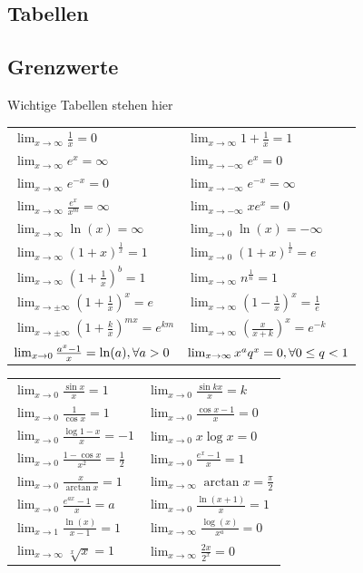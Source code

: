 \documentclass[8pt]{article}
\def\limxo{\lim_{x\to 0}}
\def\limxi{\lim_{x\to\infty}}
\def\limxn{\lim_{x\to-\infty}}
\begin{document}
\begin{multicols*}{3}
\newpage

\section{Tabellen}
\subsection{Grenzwerte}
Wichtige Tabellen stehen hier
\begin{center}
  \begin{tabularx}{\linewidth}{XX}

    $\limxi \frac{1}{x} = 0$ & $\limxi 1 + \frac{1}{x} = 1$ \\
    $\limxi e^x = \infty$ & $\limxn e^x = 0$ \\
    $\limxi e^{-x} = 0$ & $\limxn e^{-x} = \infty$ \\
    $\limxi \frac{e^x}{x^m} = \infty$ & $\limxn xe^x = 0$ \\
    $\limxi \ln(x) = \infty$ & $\limxo \ln(x) = -\infty$ \\
    $\limxi (1+x)^{\frac{1}{x}} = 1$ & $\limxo (1+x)^{\frac{1}{x}} = e$ \\
    $\limxi (1+\frac{1}{x})^b = 1$ & $\limxi n^{\frac{1}{n}} = 1$ \\
    $\lim_{x\to\pm\infty} (1 + \frac{1}{x})^x = e$ & $\limxi (1-\frac{1}{x})^x = \frac{1}{e}$ \\
    $\lim_{x\to\pm\infty} (1 + \frac{k}{x})^{mx} = e^{km}$ & $\limxi (\frac{x}{x+k})^x = e^{-k}$ \\
    $\limxo \frac{a^x -1}{x} = \ln(a), \newline \forall a > 0$ &
    $\limxi x^a q^x = 0, \newline \forall 0 \le q < 1$ \\
  \end{tabularx}
  \begin{tabularx}{\linewidth}{XX}
    $\limxo \frac{\sin x}{x} = 1$ & $\limxo \frac{\sin kx}{x} = k$\\
    $\limxo \frac{1}{\cos x} = 1$ & $\limxo \frac{\cos x -1}{x} = 0$ \\
    $\limxo \frac{\log 1 - x}{x} = -1$ & $\limxo x \log x = 0$\\
    $\limxo \frac{1 - \cos x}{x^2} = \frac{1}{2}$ & $\limxo \frac{e^x-1}{x} = 1$ \\
    $\limxo \frac{x}{\arctan x} = 1$ & $\limxi \arctan x = \frac{\pi}{2}$ \\
    $\limxo \frac{e^{ax}-1}{x} = a$ & $\limxo \frac{\ln(x+1)}{x} = 1$ \\
    $\lim_{x\to 1} \frac{\ln(x)}{x-1} = 1$ & $\limxi \frac{\log(x)}{x^a} = 0$ \\
    $\limxi \sqrt[x]{x} = 1$ & $\limxi \frac{2x}{2^x} = 0$ \\
  \end{tabularx}
\end{center}


\end{multicols*}
\end{document}
